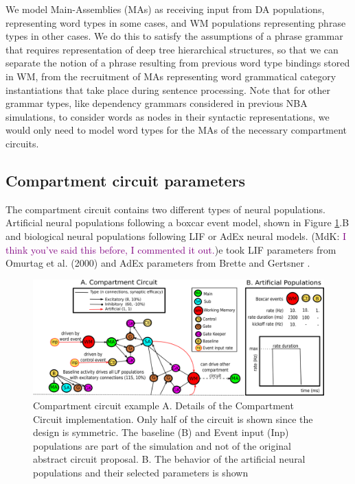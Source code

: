 \documentclass[10pt]{article}
\newcommand{\noteMdK}[2]{(MdK: \textcolor{purple}{#1})}
\begin{document}
We model Main-Assemblies (MAs)  as receiving input from DA populations, representing word types in some cases, and WM populations representing phrase types in other cases.
We do this to satisfy the assumptions of a phrase grammar that requires representation of deep tree hierarchical structures, so that we can separate the notion of a phrase resulting from previous word type bindings stored in WM, from the recruitment of MAs representing word grammatical category instantiations that take place during sentence processing.
Note that for other grammar types, like dependency grammars considered in previous NBA simulations\cite{velde2015ambiguity}, to consider words as nodes in their syntactic representations, we would only need to model word types for the MAs of the necessary compartment circuits.


\subsection{Compartment circuit parameters}\label{compartment-circuit-parameters}

The compartment circuit contains two different types of neural populations.
Artificial neural populations following a boxcar event model, shown in Figure \ref{circuit_spec}.B and biological neural populations following LIF or AdEx neural models.
\noteMdK{I think you've said this before, I commented it out.}
We took LIF parameters from Omurtag et al. (2000) \cite{omurtag2000simulation} and AdEx parameters
from Brette and Gertsner \cite{Brette_2005}.

\begin{figure}[h!]
  \begin{center}
    \includegraphics[width=1.00\columnwidth]{figures/circuit_specs3/circuit_specs3}
    \caption{{Compartment circuit example {\label{circuit_spec}} A.
Details
        of the Compartment Circuit implementation.
Only half of the
        circuit is shown since the design is symmetric.
The baseline
        (B) and Event input (Inp) populations are part of the
        simulation and not of the original abstract circuit proposal.
        B.
The behavior of the artificial neural populations and their
        selected parameters is shown%
      }}
  \end{center}
\end{figure}
\end{document}
